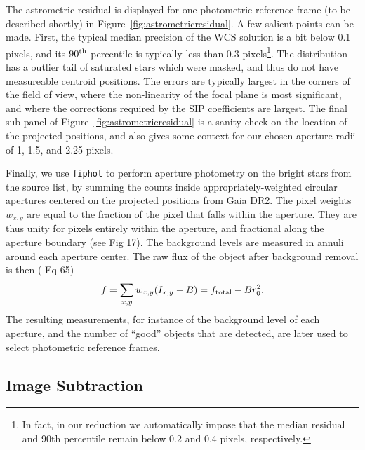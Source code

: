 \documentclass[12pt,twocolumn,tighten]{aastex62}
\begin{document}
The astrometric residual is displayed for one photometric reference
frame (to be described shortly) in
Figure~\ref{fig:astrometricresidual}.
A few salient points can be made.
First, the typical median precision of the WCS solution is a bit below
0.1 pixels, and its $90^{\rm th}$ percentile is typically less than
0.3 pixels\footnote{In fact, in our reduction we automatically impose
that the median residual and 90th percentile remain below 0.2 and 0.4
pixels, respectively.}.
The distribution has a outlier tail of saturated stars which were
masked, and thus do not have measureable centroid positions.
The errors are typically largest in the corners of the field of view,
where the non-linearity of the focal plane is most significant, and
where the corrections required by the SIP coefficients are largest.
The final sub-panel of Figure~\ref{fig:astrometricresidual} is a
sanity check on the location of the projected positions, and also
gives some context for our chosen aperture radii of 1, 1.5, and 2.25
pixels.

Finally, we use \texttt{fiphot} to perform aperture photometry on the
bright stars from the
source list, by summing the counts inside appropriately-weighted
circular apertures centered on the projected positions from Gaia DR2. 
The pixel weights $w_{x,y}$ are equal to the fraction of the pixel
that falls within the aperture.  They are thus unity for pixels
entirely within the aperture, and fractional along the aperture
boundary (see \citealt{Pal_2009} Fig 17). 
The background levels are measured in annuli around each aperture
center.  The raw flux of the object after background removal is then
(\citealt{Pal_2009} Eq 65)
\begin{equation}
  f = \sum_{x,y} w_{x,y} (I_{x,y} - B) = f_{\rm total} - B r_0^2.
  \label{eq:simple_aperture_phot}
\end{equation}
The resulting measurements, for instance of the background level of
each aperture, and the number of ``good'' objects that are detected,
are later used to select photometric reference frames.


\subsection{Image Subtraction}
\label{subsec:imagesubtraction}
\end{document}
